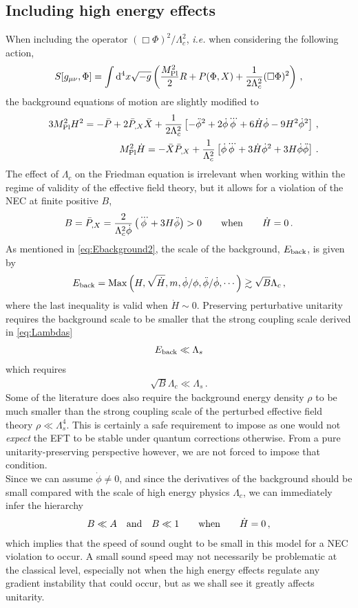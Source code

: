 \documentclass[12pt]{article}
\def\ba{\begin{eqnarray}}
\def\ea{\end{eqnarray}}
\def\mpl{M_{\rm Pl}}
\def\d{\mathrm{d}}
\def\({\left(}
\def\){\right)}
\def\ie{{\it i.e. }}
\def\mn{_{\mu \nu}}
\begin{document}
\subsection{Including high energy effects}
\label{sec:highEnergyPX}
When including the operator $(\Box \Phi)^2/\Lambda_c^2$, \ie when considering the following action,
\ba
S[g\mn, \Phi]=\int \d^4 x \sqrt{-g}\(\frac{\mpl^2}{2}R +P(\Phi,X)  +\frac{1}{2\Lambda_c^2} (\Box \Phi)^2 \) \,,
\ea
the background equations of motion are slightly modified to
\ba
\label{eq:FriedPXLambdac}
&& 3 \mpl^2 H^2 = - \bar P +2 \bar P_{,X} \bar X+\frac{1}{2\Lambda_c^2}\left[-\ddot \phi^2+2\dot \phi \dddot \phi+6 \dot H\dot \phi-9H^2 \dot \phi^2 \right] \, , \\
&& \mpl^2 \dot H =  - \bar X \bar P_{,X} +\frac{1}{\Lambda_c^2} \left[\dot \phi \dddot \phi + 3\dot H \dot \phi^2+3 H \dot \phi \ddot \phi  \right]\,.
\label{eq:raychaudhuriLambdac}
\ea
 The effect of $\Lambda_c$ on the Friedman equation is irrelevant when working within the regime of validity of the effective field theory, but it allows for a violation of the NEC at finite positive $B$,
\ba
B=\bar P_{,X}=\frac{2}{\Lambda_c^2 \dot{\phi}}\(\dddot{{\phi}}+3 H \ddot{\phi}\)>0 \qquad {\rm when }\qquad \dot H=0\,.
\ea
As mentioned in \eqref{eq:Ebackground2}, the scale of the background, $E_{\rm back}$, is given by
\ba
\label{eq:Ebackground}
E_{\rm back} = {\rm Max}\(H, \sqrt{\dot H}, m,  \dot \phi/ \phi, \ddot \phi / \dot \phi, \cdots \)\gtrsim \sqrt{B} \Lambda_c \,,
\ea
where the last inequality is valid when $\dot H\sim0$. Preserving perturbative unitarity requires the background scale to be smaller that the strong coupling scale derived in \eqref{eq:Lambdas}
\ba
E_{\rm back} \ll \Lambda_s
\ea
which requires
\ba
\label{eq:UnitarityReq}
\sqrt{B} \Lambda_c \ll \Lambda_s\,.
\ea
Some of the literature does also require the background energy density $\rho$ to be much smaller than the strong coupling scale of the perturbed effective field theory $\rho \ll \Lambda_s^4$. This is certainly a safe requirement to impose as one would not {\it expect} the EFT to be stable under quantum corrections otherwise. From a pure unitarity-preserving perspective however, we are not forced to impose that condition.  \\


Since we can assume $\dot{\phi} \ne 0$, and since the derivatives of the background should be small compared with the scale of high energy physics $\Lambda_c$, we can immediately infer the hierarchy
\ba
B \ll A \quad {\rm and }\quad B\ll 1 \qquad {\rm when }\qquad \dot H=0\,,
\ea
which implies that the speed of sound ought to be small in this model for a NEC violation to occur. A small sound speed may not necessarily be problematic at the classical level, especially not when the high energy effects regulate any gradient instability that could occur, but as we shall see it greatly affects unitarity.
\end{document}
